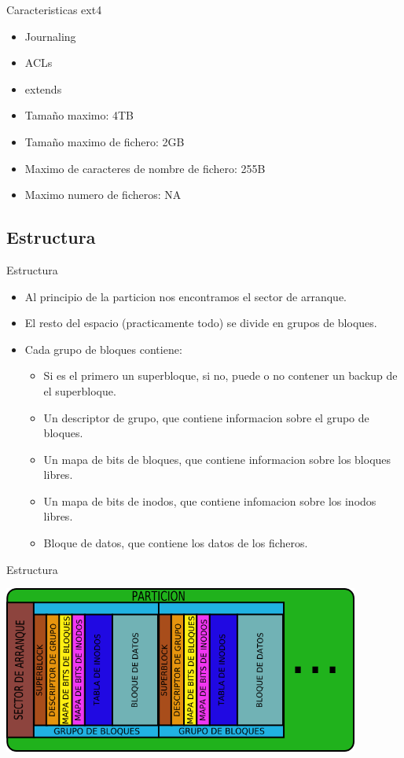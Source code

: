 \begin{frame}{Caracteristicas ext4}
  \begin{itemize}
    \item Journaling
    \item ACLs
    \item extends
    \item Tamaño maximo: 4TB
    \item Tamaño maximo de fichero: 2GB
    \item Maximo de caracteres de nombre de fichero: 255B
    \item Maximo numero de ficheros: NA
  \end{itemize}
\end{frame}

\subsection{Estructura}
\begin{frame}{Estructura}
  \begin{itemize}
    \item Al principio de la particion nos encontramos el sector de arranque.
    \item El resto del espacio (practicamente todo) se divide en grupos de bloques.
    \item Cada grupo de bloques contiene:
    \begin{itemize}
      \item Si es el primero un superbloque, si no, puede o no contener un backup de el superbloque.
      \item Un descriptor de grupo, que contiene informacion sobre el grupo de bloques.
      \item Un mapa de bits de bloques, que contiene informacion sobre los bloques libres.
      \item Un mapa de bits de inodos, que contiene infomacion sobre los inodos libres.
      \item Bloque de datos, que contiene los datos de los ficheros.
    \end{itemize}
  \end{itemize}
\end{frame}

\begin{frame}{Estructura}
  \begin{center}
    \includegraphics[height=5.5cm]{imgs/ext_struct.png}
  \end{center}
\end{frame}

